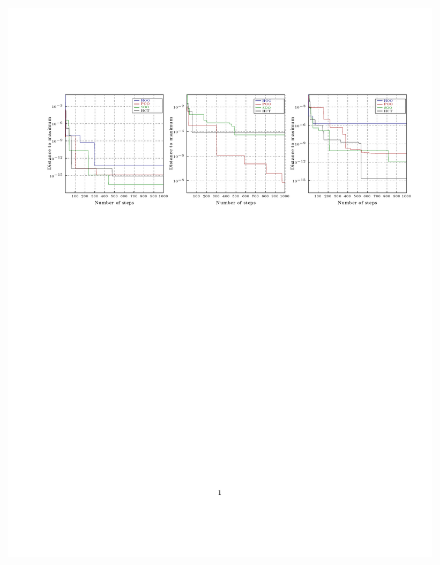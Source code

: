 \documentclass[a4paper,10pt]{article}
\begin{document}
\begin{figure}
\centering
\label{fig:noise01}
\includegraphics[trim={0 6cm 0 4cm},clip]{best1000_01.pdf}\\

\end{figure}
\end{document}
